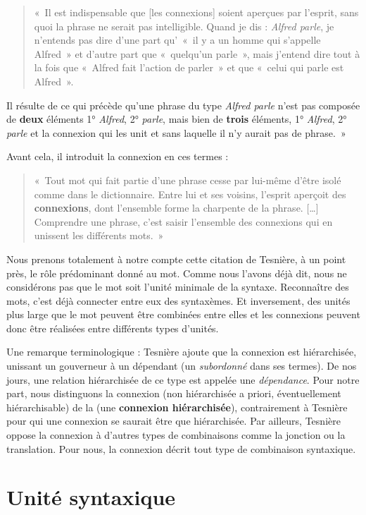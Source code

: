 \begin{quote}
    «~Il est indispensable que [les connexions] soient aperçues par l’esprit, sans quoi la phrase ne serait pas intelligible. Quand je dis : \textit{Alfred parle}, je n’entends pas dire d’une part qu’~«~il y a un homme qui s’appelle Alfred~» et d’autre part que «~quelqu’un parle~», mais j’entend dire tout à la fois que «~Alfred fait l’action de parler~» et que «~celui qui parle est Alfred~».
\end{quote}
Il résulte de ce qui précède qu’une phrase du type \textit{Alfred parle} n’est pas composée de \textbf{deux} éléments 1° \textit{Alfred}, 2° \textit{parle}, mais bien de \textbf{trois} éléments, 1° \textit{Alfred}, 2° \textit{parle} et la connexion qui les unit et sans laquelle il n’y aurait pas de phrase.~»

Avant cela, il introduit la connexion en ces termes :
\begin{quote}
    «~Tout mot qui fait partie d’une phrase cesse par lui-même d’être isolé comme dans le dictionnaire. Entre lui et ses voisins, l’esprit aperçoit des \textbf{connexions}, dont l’ensemble forme la charpente de la phrase. […] Comprendre une phrase, c’est saisir l’ensemble des connexions qui en unissent les différents mots.~»
\end{quote}
Nous prenons totalement à notre compte cette citation de Tesnière, à un point près, le rôle prédominant donné au mot. Comme nous l’avons déjà dit, nous ne considérons pas que le mot soit l’unité minimale de la syntaxe. Reconnaître des mots, c’est déjà connecter entre eux des syntaxèmes. Et inversement, des unités plus large que le mot peuvent être combinées entre elles et les connexions peuvent donc être réalisées entre différents types d’unités.

Une remarque terminologique : Tesnière ajoute que la connexion est hiérarchisée, unissant un gouverneur à un dépendant (un \textit{subordonné} dans ses termes). De nos jours, une relation hiérarchisée de ce type est appelée une \textit{dépendance}. Pour notre part, nous distinguons la connexion (non hiérarchisée a priori, éventuellement hiérarchisable) de la  (une \textbf{connexion hiérarchisée}), contrairement à Tesnière pour qui une connexion se saurait être que hiérarchisée. Par ailleurs, Tesnière oppose la connexion à d’autres types de combinaisons comme la jonction ou la translation. Pour nous, la connexion décrit tout type de combinaison syntaxique.

\section{Unité syntaxique}\label{sec:3.2.9}

